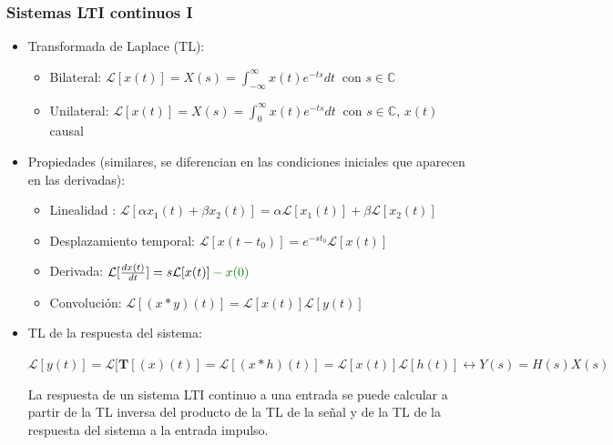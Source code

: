 \begin{frame}
\frametitle{Sistemas LTI continuos I}

\vspace{-0,3cm}


\begin{itemize}
\item <1-> \alert{Transformada de Laplace (TL)}:

\begin{itemize}
\item Bilateral:    $\mathcal{L}{[x(t)]}\!=\!X(s)\!=\! \int_{-\infty}^{\infty} \! \!x(t) e^{-t s} dt \:$ con   $s \in \mathbb{C}$


\vspace{0.1cm}

\item \color{olivegreen} Unilateral:    $\mathcal{L}{[x(t)]}\!=\!X(s)\!= \!\int_{0}^{\infty} \! \! x(t) e^{-t s}dt  \:$ con   $s \in \mathbb{C}$, $x(t)$ causal \color{black}

\vspace{-0.4cm}

\end{itemize}

\item <2-> \alert{Propiedades} (similares, se diferencian en las condiciones iniciales que aparecen en las derivadas):

\begin{itemize}
\item Linealidad : $\mathcal{L}[\alpha x_1(t)+\beta  x_2(t)]=\alpha \mathcal{L}[x_1(t)]+\beta \mathcal{L}[x_2(t)]$
\vspace{0.2cm}
\item Desplazamiento temporal: $\mathcal{L}[x(t-t_0)]=e^{-st_0} \mathcal{L}[x(t)]$
\vspace{0.2cm}
\item Derivada: $\mathcal{L}[\frac {dx(t)}{dt}]=s \mathcal{L}[x(t)]\color{olivegreen}-x(0)\color{black}$
\vspace{0.2cm}
\item Convolución: $\mathcal{L}[{(x*y)(t)}]= \mathcal{L}[x(t)]\mathcal{L}[y(t)]$
\end{itemize}

\item <3-> \alert{TL de la respuesta del sistema}:

\vspace{0.2cm}

\footnotesize $\mathcal{L}[ y(t)]\!=\!\mathcal{L}[ \bm T[{(x)(t)}]\!=\!\mathcal{L}[{(x*h)(t)}]\!=\!\mathcal{L}[{x(t)}]\mathcal{L}[{h(t)}]   \leftrightarrow     Y(s)\!=\!H(s)X(s)$  

\vspace{0.2cm}

La respuesta de un sistema LTI continuo a una entrada se puede calcular a partir de la TL inversa del producto de la TL de la señal y de la TL de la respuesta del sistema a la entrada impulso. 
\end{itemize}


\end{frame}

